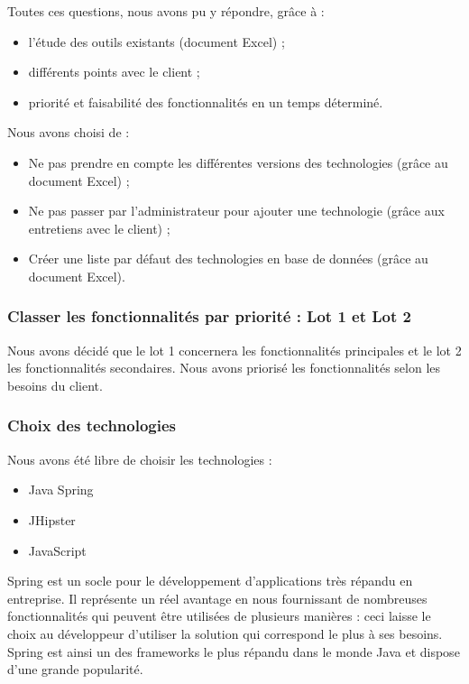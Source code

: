 Toutes ces questions, nous avons pu y répondre, grâce à :
\begin{itemize}
\item l'étude des outils existants (document Excel) ;
\item différents points avec le client ;
\item priorité et faisabilité des fonctionnalités en un temps déterminé.
\end{itemize}

Nous avons choisi de :
\begin{itemize}
\item Ne pas prendre en compte les différentes versions des technologies (grâce au document Excel) ; 
\item Ne pas passer par l'administrateur pour ajouter une technologie (grâce aux entretiens avec le client) ;
\item Créer une liste par défaut des technologies en base de données (grâce au document Excel).
\end{itemize}


\subsubsection{Classer les fonctionnalités par priorité : Lot 1 et Lot 2}

Nous avons décidé que le lot 1 concernera les fonctionnalités principales et le lot 2 les fonctionnalités secondaires. Nous avons priorisé les fonctionnalités selon les besoins du client.

\subsubsection{Choix des technologies}

Nous avons été libre de choisir les technologies : 
\begin{itemize}
\item Java Spring 
\item JHipster 
\item JavaScript
\end{itemize}

Spring est un socle pour le développement d'applications très répandu en entreprise. Il représente un réel avantage en nous fournissant de nombreuses fonctionnalités qui peuvent être utilisées de plusieurs manières : ceci laisse le choix au développeur d'utiliser la solution qui correspond le plus à ses besoins.
Spring est ainsi un des frameworks le plus répandu dans le monde Java et dispose d'une grande popularité.

